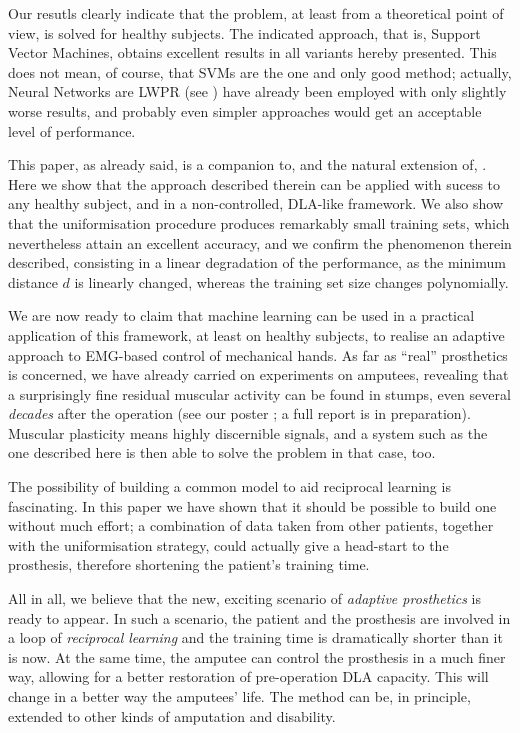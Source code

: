 Our resutls clearly indicate that the problem, at least from a
theoretical point of view, is solved for healthy subjects. The
indicated approach, that is, Support Vector Machines, obtains
excellent results in all variants hereby presented. This does not
mean, of course, that SVMs are the one and only good method; actually,
Neural Networks are LWPR (see \cite{lwpr}) have already been employed
with only slightly worse results, and probably even simpler approaches
would get an acceptable level of performance.

This paper, as already said, is a companion to, and the natural
extension of, \cite{2008.ICRA,2008.BioCyb}. Here we show that the
approach described therein can be applied with sucess to any healthy
subject, and in a non-controlled, DLA-like framework. We also show
that the uniformisation procedure produces remarkably small training
sets, which nevertheless attain an excellent accuracy, and we confirm
the phenomenon therein described, consisting in a linear degradation
of the performance, as the minimum distance $d$ is linearly changed,
whereas the training set size changes polynomially.

We are now ready to claim that machine learning can be used in a
practical application of this framework, at least on healthy subjects,
to realise an adaptive approach to EMG-based control of mechanical
hands. As far as ``real'' prosthetics is concerned, we have already
carried on experiments on amputees, revealing that a surprisingly fine
residual muscular activity can be found in stumps, even several
\emph{decades} after the operation (see our poster
\cite{2008.Neurorob}; a full report is in preparation). Muscular
plasticity means highly discernible signals, and a system such as the
one described here is then able to solve the problem in that case,
too.

The possibility of building a common model to aid reciprocal learning
is fascinating. In this paper we have shown that it should be possible
to build one without much effort; a combination of data taken from
other patients, together with the uniformisation strategy, could
actually give a head-start to the prosthesis, therefore shortening the
patient's training time.

All in all, we believe that the new, exciting scenario of
\emph{adaptive prosthetics} is ready to appear. In such a scenario,
the patient and the prosthesis are involved in a loop of
\emph{reciprocal learning} and the training time is dramatically
shorter than it is now. At the same time, the amputee can control the
prosthesis in a much finer way, allowing for a better restoration of
pre-operation DLA capacity. This will change in a better way the
amputees' life. The method can be, in principle, extended to other
kinds of amputation and disability.
